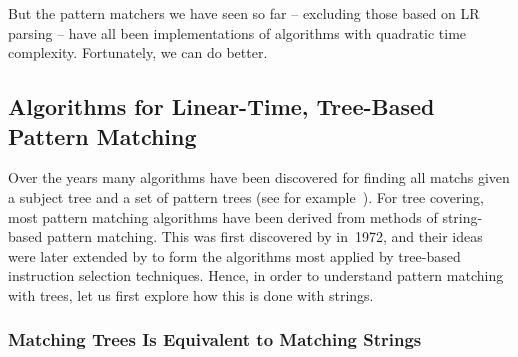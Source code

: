 But the \glspl{pattern matcher} we have seen so far -- excluding those based on
\gls{LR parsing} -- have all been implementations of algorithms with quadratic
time complexity.
%
Fortunately, we can do better.


\subsection{Algorithms for Linear-Time, Tree-Based Pattern Matching}

Over the years many algorithms have been discovered for finding all
\glspl{match} given a subject \gls{tree} and a set of \glspl{pattern tree} (see
for example~\cite{KarpEtAl:1972, HoffmannODonnell:1982, PurdomBrown:1985,
  WeisgerberWilhelm:1988, RameshRamakrishnan:1992, DubinerEtAl:1994,
  ChenEtAl:1995, ColeHariharan:1997, ShamirTsur:1999, WuuYang:2000}).
%
For \gls{tree covering}, most \gls{pattern matching} algorithms have been
derived from methods of string-based \gls{pattern matching}.
%
This was first discovered by \textcite{KarpEtAl:1972} in~1972, and their ideas
were later extended by \textcite{HoffmannODonnell:1982} to form the algorithms
most applied by \gls{tree}-based \gls{instruction selection} techniques.
%
Hence, in order to understand \gls{pattern matching} with \glspl{tree}, let us
first explore how this is done with strings.


\subsubsection{Matching Trees Is Equivalent to Matching Strings}

